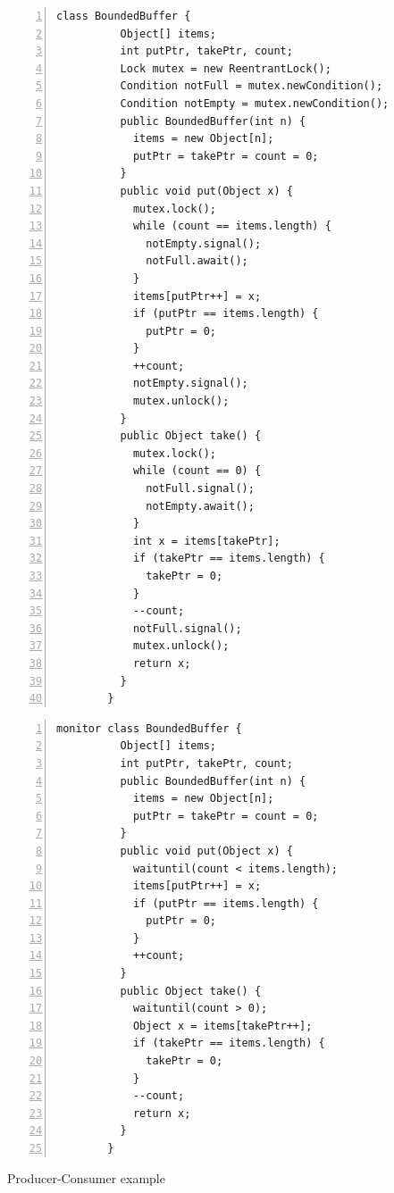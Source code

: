 \documentclass[preprint]{sigplanconf}
\begin{document}
\begin{figure}[ht!]
\begin{multicols}{2}
    \begin{Verbatim}[fontsize=\footnotesize,gobble=8,frame=topline,
            framesep=5mm,numbers=left,numbersep=2pt,
            label=\fbox{\small\emph{Explicit-Signal}}]
        class BoundedBuffer {
          Object[] items;  
          int putPtr, takePtr, count;
          Lock mutex = new ReentrantLock();
          Condition notFull = mutex.newCondition();
          Condition notEmpty = mutex.newCondition();
          public BoundedBuffer(int n) {
            items = new Object[n];
            putPtr = takePtr = count = 0;
          }
          public void put(Object x) {
            mutex.lock();
            while (count == items.length) {
              notEmpty.signal();
              notFull.await();
            }
            items[putPtr++] = x;
            if (putPtr == items.length) {
              putPtr = 0;
            }
            ++count;
            notEmpty.signal();
            mutex.unlock();
          }
          public Object take() {
            mutex.lock();
            while (count == 0) {
              notFull.signal();
              notEmpty.await();
            }
            int x = items[takePtr];
            if (takePtr == items.length) {
              takePtr = 0;
            }
            --count;
            notFull.signal();
            mutex.unlock();
            return x;
          }
        }
    \end{Verbatim}
    \begin{Verbatim}[fontsize=\footnotesize,gobble=8,frame=lines,framesep=5mm,
            numbers=left,numbersep=2pt,
            label=\fbox{\small\emph{Implicit-Signal}}]
        monitor class BoundedBuffer { 
          Object[] items; 
          int putPtr, takePtr, count; 
          public BoundedBuffer(int n) {
            items = new Object[n];
            putPtr = takePtr = count = 0;
          }
          public void put(Object x) { 
            waituntil(count < items.length); 
            items[putPtr++] = x; 
            if (putPtr == items.length) { 
              putPtr = 0; 
            } 
            ++count; 
          } 
          public Object take() { 
            waituntil(count > 0); 
            Object x = items[takePtr++]; 
            if (takePtr == items.length) { 
              takePtr = 0; 
            }
            --count;
            return x;
          }
        }
    \end{Verbatim}
\end{multicols}
  \caption{Producer-Consumer example}
  \label{fig:bb_exp}
\end{figure}
\end{document}
